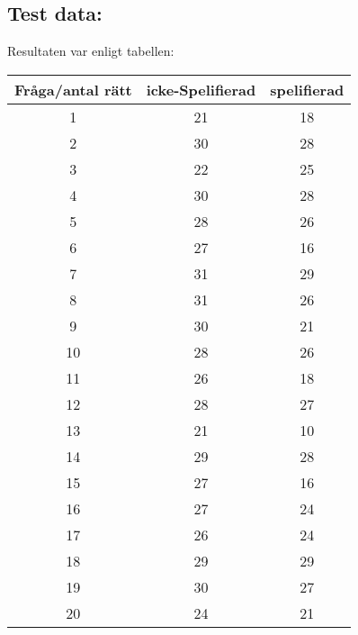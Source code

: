 \documentclass[11p]{article}
\begin{document}
\subsection{Test data:}
Resultaten var enligt tabellen:
\begin{center}
    \begin{tabular}{ ||c |c c|| }
        \hline
        Fråga/antal rätt & icke-Spelifierad & spelifierad \\
        \hline
        \hline
        1 & 21 & 18 \\
        \hline
        2 & 30 & 28 \\
        \hline
        3 & 22 & 25 \\
        \hline
        4 & 30 & 28 \\
        \hline
        5 & 28 & 26 \\
        \hline
        6 & 27 & 16 \\
        \hline
        7 & 31 & 29 \\
        \hline
        8 & 31 & 26 \\
        \hline
        9 & 30 & 21 \\
        \hline
        10 & 28 & 26 \\
        \hline
        11 & 26 & 18 \\
        \hline
        12 & 28 & 27 \\
        \hline
        13 & 21 & 10 \\
        \hline
        14 & 29 & 28 \\
        \hline
        15 & 27 & 16 \\
        \hline
        16 & 27 & 24 \\
        \hline
        17 & 26 & 24 \\
        \hline
        18 & 29 & 29 \\
        \hline
        19 & 30 & 27 \\
        \hline
        20 & 24 & 21 \\
        \hline
    \end{tabular}
\end{center}
\end{document}
